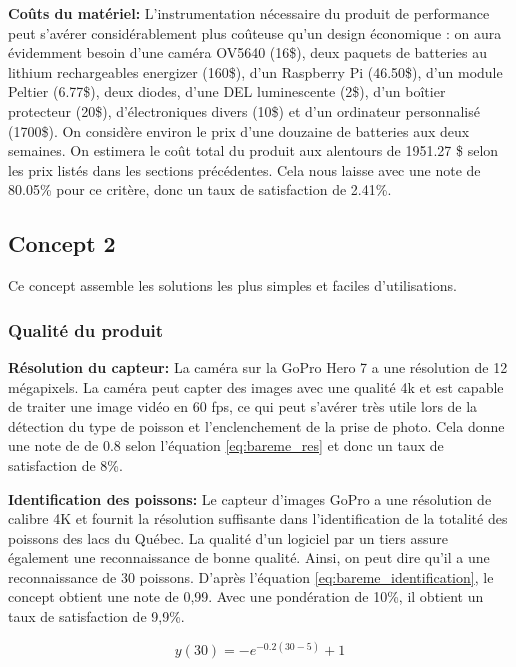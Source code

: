 \textbf{Coûts du matériel:}
L’instrumentation nécessaire du produit de performance peut s’avérer considérablement plus coûteuse qu'un design économique : on aura évidemment besoin d’une caméra OV5640 (16\$), deux paquets de batteries au lithium rechargeables energizer (160\$), d'un Raspberry Pi (46.50\$), d'un module Peltier (6.77\$), deux diodes, d'une DEL luminescente (2\$), d'un boîtier protecteur (20\$), d'électroniques divers (10\$) et d'un ordinateur personnalisé (1700\$). On considère environ le prix d'une douzaine de batteries aux deux semaines. On estimera le coût total du produit aux alentours de 1951.27 \$ selon les prix listés dans les sections précédentes. Cela nous laisse avec une note de 80.05\% pour ce critère, donc un taux de satisfaction de 2.41\%. 




\subsection{Concept 2}
Ce concept assemble les solutions les plus simples et faciles d'utilisations.

\subsubsection{Qualité du produit}


\textbf{Résolution du capteur:} La caméra sur la GoPro Hero 7 a une résolution de 12 mégapixels. La caméra peut capter des images avec une qualité 4k et est capable de traiter une image vidéo en 60 fps, ce qui peut s’avérer très utile lors de la détection du type de poisson et l’enclenchement de la prise de photo. Cela donne une note de de 0.8 selon l'équation \ref{eq:bareme_res} et donc un taux de satisfaction de 8\%.
\vspace{5mm}



\textbf{Identification des poissons:}
Le capteur d'images GoPro a une résolution de calibre 4K et fournit la résolution suffisante dans l'identification de la totalité des poissons des lacs du Québec. La qualité d'un logiciel par un tiers assure également une reconnaissance de bonne qualité. Ainsi, on peut dire qu'il a une reconnaissance de 30 poissons. D'après l'équation \ref{eq:bareme_identification}, le concept obtient une note de 0,99. Avec une pondération de 10\%, il obtient un taux de satisfaction de 9,9\%.

\begin{equation}
    y(30) = -e^{-0.2(30-5)} + 1  \end{equation}
\vspace{5mm}


